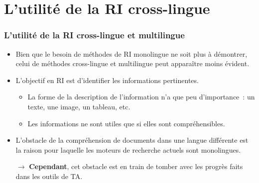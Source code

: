 \documentclass[11pt,aspectratio=43,dvipsnames,table]{beamer}
\begin{document}
\section{L'utilité de la RI cross-lingue}


\begin{frame}
    \frametitle{L'utilité de la RI cross-lingue et multilingue}
    \begin{itemize} \itemsep10pt
        \item Bien que le besoin de méthodes de RI monolingue ne soit plus à 
              démontrer, celui de méthodes cross-lingue et multilingue 
              peut apparaître moins évident.
        \item L'objectif en RI est d'identifier les informations pertinentes.
        \begin{itemize}
            \item La forme de la description de l'information n'a que peu
                  d'importance~: un texte, une image, un tableau, etc.
            \item Les informations ne sont utiles que si elles sont 
                  compréhensibles.
        \end{itemize}
        \item L'obstacle de la compréhension de documents dans une langue 
              différente est la raison pour laquelle les moteurs de recherche 
              actuels sont monolingues.
        \item[$\to$] \textbf{Cependant}, cet obstacle est en train de tomber 
                     avec les progrès faits dans les outils de TA.
    \end{itemize}
\end{frame}
\end{document}
